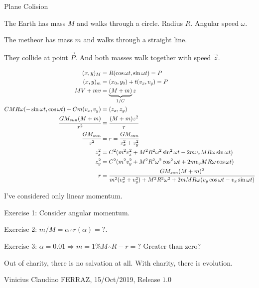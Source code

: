 \documentclass[11pt]{article}
\begin{document}
\Large

\begin{center}
Plane Colision
\end{center}

\normalsize

The Earth has mass $M$ and walks through a circle. Radius $R$. Angular speed $\omega$.

The metheor has mass $m$ and walks through a straight line.

They collide at point $\vec P$. And both masses walk together with speed $\vec z$.

\begin{align}
(x,y)_M &= R (\cos \omega t, \sin \omega t) = P \\
(x,y)_m &= (x_0, y_0) + t (v_x, v_y) = P \\
MV + mv &= \underbrace{(M + m)}_{1/C} z \\
C MR\omega (-\sin \omega t, \cos \omega t) + C m(v_x, v_y) &= (z_x, z_y) \\
\cfrac{G M_{sun} (M+m)}{r^2} &= \cfrac{(M + m)z^2}{r} \\
\cfrac{G M_{sun}}{z^2} &= r = \cfrac{G M_{sun}}{z_x^2 + z_y^2} \\
z_x^2 &= C^2(m^2v_x^2 + M^2R^2\omega^2 \sin^2 \omega t - 2mv_x MR\omega \sin \omega t) \\
z_y^2 &= C^2(m^2v_y^2 + M^2R^2\omega^2 \cos^2 \omega t + 2mv_y MR\omega \cos \omega t) \\
r &= \cfrac{G M_{sun} (M + m)^2}{m^2(v_x^2 + v_y^2) + M^2R^2\omega^2 + 2m MR\omega (v_y \cos \omega t - v_x \sin \omega t)}
\end{align}

I've considered only linear momentum.

Exercise 1: Consider angular momentum.

Exercise 2: $m/M = \alpha \therefore r(\alpha) = ?$.

Exercise 3: $\alpha = 0.01 \Rightarrow m = 1\% M \therefore R - r = ?$ Greater than zero?

		\vspace{3mm}

Out of charity, there is no salvation at all. With charity, there is evolution.

\vspace{3mm}

Vinicius Claudino FERRAZ, 15/Oct/2019, Release $1.0$
\end{document}
